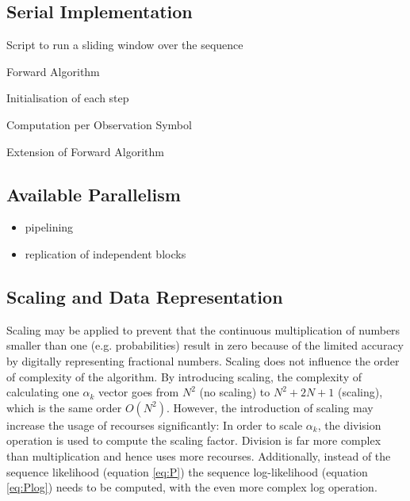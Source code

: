 \documentclass[mscthesis]{usiinfthesis}
\begin{document}
\subsection{Serial Implementation}

Script to run a sliding window over the sequence

Forward Algorithm

Initialisation of each step

Computation per Observation Symbol

Extension of Forward Algorithm


\subsection{Available Parallelism}

\begin{itemize}
    \item pipelining
    \item replication of independent blocks
\end{itemize}

\subsection{Scaling and Data Representation}

Scaling may be applied to prevent that the continuous multiplication of numbers
smaller than one (e.g. probabilities) result in zero because of the limited
accuracy by digitally representing fractional numbers. Scaling does not
influence the order of complexity of the algorithm. By introducing scaling, the
complexity of calculating one $ \alpha_k $ vector goes from $ N^2 $ (no
scaling) to $ N^2 + 2N + 1 $ (scaling), which is the same order $ O(N^2) $.
However, the introduction of scaling may increase the usage of recourses
significantly: In order to scale $ \alpha_k $, the division operation is used
to compute the scaling factor.  Division is far more complex than
multiplication and hence uses more recourses.  Additionally, instead of the
sequence likelihood (equation \ref{eq:P}) the sequence log-likelihood (equation
\ref{eq:Plog}) needs to be computed, with the even more complex log operation.
\end{document}
